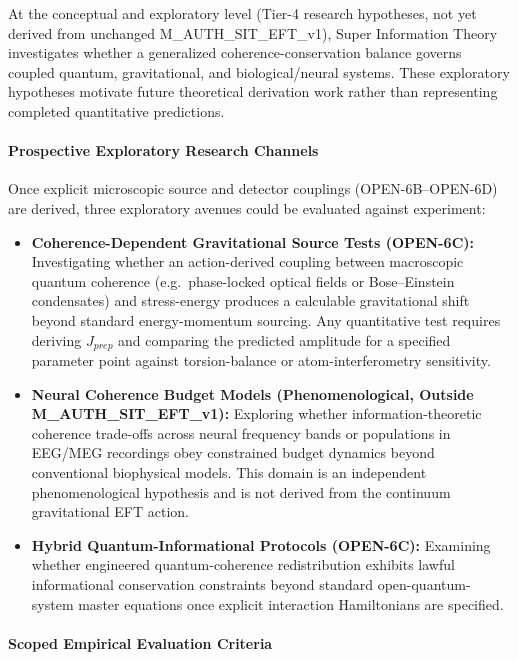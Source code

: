 \documentclass[american,11pt,letterpaper]{article}
\def\mathrm#1{#1}%
\def\texttt#1{#1}%
\begin{document}
At the conceptual and exploratory level (Tier-4 research hypotheses, not yet derived from unchanged \texttt{M\_AUTH\_SIT\_EFT\_v1}), Super Information Theory investigates whether a generalized coherence-conservation balance governs coupled quantum, gravitational, and biological/neural systems. These exploratory hypotheses motivate future theoretical derivation work rather than representing completed quantitative predictions.

\paragraph{Prospective Exploratory Research Channels}

Once explicit microscopic source and detector couplings (\texttt{OPEN-6B}--\texttt{OPEN-6D}) are derived, three exploratory avenues could be evaluated against experiment:

\begin{itemize}
    \item \textbf{Coherence-Dependent Gravitational Source Tests (\texttt{OPEN-6C}):} Investigating whether an action-derived coupling between macroscopic quantum coherence (e.g.\ phase-locked optical fields or Bose--Einstein condensates) and stress-energy produces a calculable gravitational shift beyond standard energy-momentum sourcing. Any quantitative test requires deriving $J_{\mathrm{prep}}$ and comparing the predicted amplitude for a specified parameter point against torsion-balance or atom-interferometry sensitivity.
    \item \textbf{Neural Coherence Budget Models (Phenomenological, Outside \texttt{M\_AUTH\_SIT\_EFT\_v1}):} Exploring whether information-theoretic coherence trade-offs across neural frequency bands or populations in EEG/MEG recordings obey constrained budget dynamics beyond conventional biophysical models. This domain is an independent phenomenological hypothesis and is not derived from the continuum gravitational EFT action.
    \item \textbf{Hybrid Quantum-Informational Protocols (\texttt{OPEN-6C}):} Examining whether engineered quantum-coherence redistribution exhibits lawful informational conservation constraints beyond standard open-quantum-system master equations once explicit interaction Hamiltonians are specified.
\end{itemize}

\paragraph{Scoped Empirical Evaluation Criteria}
\end{document}
